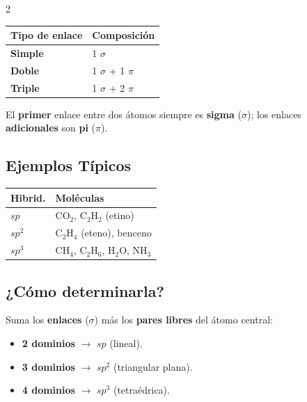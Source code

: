 \documentclass[9pt, landscape, letterpaper]{extarticle}
\begin{document}
\begin{multicols}{2}
  \begin{tablabox}
    \tablacompacta
    \begin{tabular}{@{}l l@{}}
      \toprule
      Tipo de enlace & Composición     \\
      \midrule
      \textbf{Simple}  & 1 $\sigma$      \\
      \textbf{Doble}   & 1 $\sigma$ + 1 $\pi$ \\
      \textbf{Triple}  & 1 $\sigma$ + 2 $\pi$ \\
      \bottomrule
    \end{tabular}
  \end{tablabox}

  \begin{notabox}[Recuerda]
    El \textbf{primer} enlace entre dos átomos siempre es \textbf{sigma}
    ($\sigma$); los enlaces \textbf{adicionales} son \textbf{pi} ($\pi$).
  \end{notabox}

  \subsection{Ejemplos Típicos}

  \begin{tablabox}
    \tablacompacta
    \begin{tabular}{@{}l l@{}}
      \toprule
      Hibrid. & Moléculas                      \\
      \midrule
      $sp$    & CO$_2$, C$_2$H$_2$ (etino)     \\
      $sp^2$  & C$_2$H$_4$ (eteno), benceno    \\
      $sp^3$  & CH$_4$, C$_2$H$_6$, H$_2$O, NH$_3$ \\
      \bottomrule
    \end{tabular}
  \end{tablabox}

  \subsection{¿Cómo determinarla?}

  \begin{notabox}
    Suma los \textbf{enlaces} ($\sigma$) más los \textbf{pares libres}
    del átomo central:
    \begin{itemize}
      \item \textbf{2 dominios} $\to$ $sp$ (lineal).
      \item \textbf{3 dominios} $\to$ $sp^2$ (triangular plana).
      \item \textbf{4 dominios} $\to$ $sp^3$ (tetraédrica).
    \end{itemize}
  \end{notabox}

\end{multicols}
\end{document}
